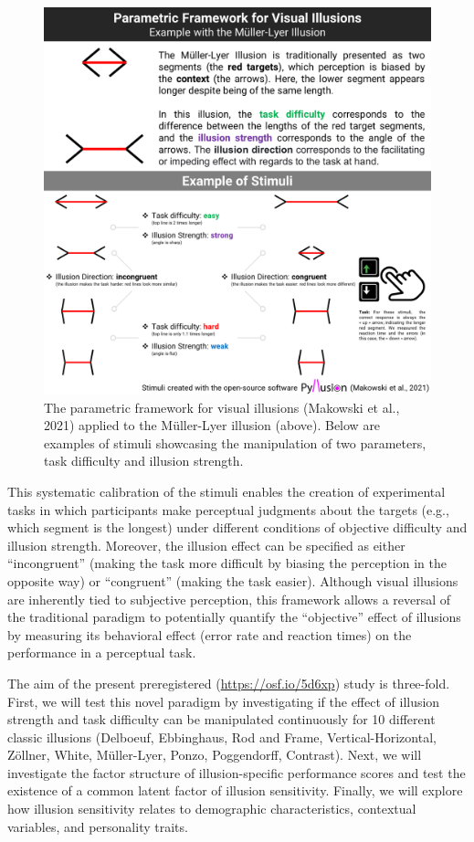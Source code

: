\documentclass[
  man,floatsintext]{apa6}
\begin{document}
\begin{figure}
\includegraphics[width=1\linewidth]{../figures/Figure1} \caption{The parametric framework for visual illusions (Makowski et al., 2021) applied to the Müller-Lyer illusion (above). Below are examples of stimuli showcasing the manipulation of two parameters, task difficulty and illusion strength.}\label{fig:unnamed-chunk-2}
\end{figure}

This systematic calibration of the stimuli enables the creation of experimental tasks in which participants make perceptual judgments about the targets (e.g., which segment is the longest) under different conditions of objective difficulty and illusion strength. Moreover, the illusion effect can be specified as either ``incongruent'' (making the task more difficult by biasing the perception in the opposite way) or ``congruent'' (making the task easier). Although visual illusions are inherently tied to subjective perception, this framework allows a reversal of the traditional paradigm to potentially quantify the ``objective'' effect of illusions by measuring its behavioral effect (error rate and reaction times) on the performance in a perceptual task.

The aim of the present preregistered (\url{https://osf.io/5d6xp}) study is three-fold. First, we will test this novel paradigm by investigating if the effect of illusion strength and task difficulty can be manipulated continuously for 10 different classic illusions (Delboeuf, Ebbinghaus, Rod and Frame, Vertical-Horizontal, Zöllner, White, Müller-Lyer, Ponzo, Poggendorff, Contrast). Next, we will investigate the factor structure of illusion-specific performance scores and test the existence of a common latent factor of illusion sensitivity. Finally, we will explore how illusion sensitivity relates to demographic characteristics, contextual variables, and personality traits.
\end{document}
